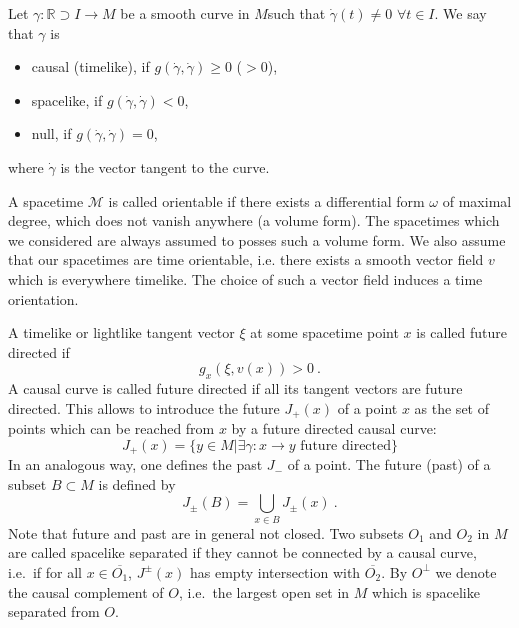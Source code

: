 \documentclass[12pt]{article}
\newcommand{\Mcal}{\mathcal{M}}
\newcommand{\RR}{\mathbb{R}}           %
\newcommand{\1}{\mathds{1}}                         %
\begin{document}
\begin{df}
Let $\gamma: \RR\supset I\rightarrow M$ be a smooth curve in $M$such that $\dot{\gamma}(t)\neq0$ $\forall t\in I$. We say that $\gamma$ is 
\begin{itemize}
\item causal (timelike), if  $g(\dot{\gamma},\dot{\gamma})\geq 0$ ($>0$),
\item spacelike, if  $g(\dot{\gamma},\dot{\gamma})< 0$,
\item null, if  $g(\dot{\gamma},\dot{\gamma})= 0$,
\end{itemize}
where $\dot{\gamma}$ is the vector tangent to the curve.
\end{df}

A spacetime $\Mcal$ is called orientable if there exists a differential form $\omega$ of maximal degree, which does not vanish anywhere  (a volume form). The spacetimes which we considered are always assumed to posses such a volume form. We also assume that our spacetimes are time orientable, i.e. there exists a smooth vector field $v$ which is everywhere timelike. The choice of such a vector field  induces a time orientation.

A timelike or lightlike tangent vector $\xi$ at some spacetime point $x$ is called future directed if 
\[g_x(\xi,v(x))>0\ .\] 
A causal curve is called future directed if all its tangent vectors are future directed. This allows to introduce the future $J_+(x)$ of a point $x$ as the set of points which can be reached from $x$ by a future directed causal curve:
\[J_{+}(x)=\{y\in M| \exists \gamma:x\to y \text{ future directed}\}\] 
In an analogous way, one defines the past $J_-$ of a point. The future (past) of a subset $B\subset M$ is defined by
\[J_\pm(B)=\bigcup_{x\in B}J_\pm(x)\ .\]
Note that future and past are in general not closed. 
Two subsets $O_1$ and $O_2$ in $M$ are called
spacelike separated if they cannot be connected by a causal curve, i.e.\
if for all $x \in \overline{O_1}$,
 $J^{\pm}(x)$ has empty intersection with $\overline{O_2}$.
By $O^{\perp}$ we denote the causal complement of $O$, i.e.\ the
largest open set in $M$ which is spacelike separated from $O$.
\end{document}
